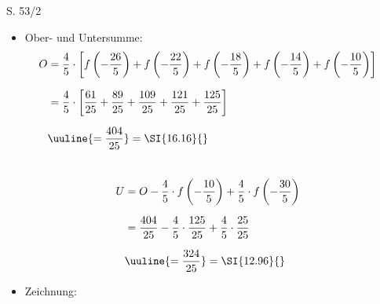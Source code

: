\begin{Exercise}{S. 53/2}{}
\begin{enumerate}[leftmargin=*]
\begin{enumerate}[label=\alph*),leftmargin=*]
{\begin{itemize}[leftmargin=*]
{                    }
                \item Ober- und Untersumme: \\[-2.0ex]{
                    \begin{align*}
                        O &= \dfrac{4}{5} \cdot \left[f\left(-\frac{26}{5}\right) + f\left(-\frac{22}{5}\right) + f\left(-\frac{18}{5}\right) + f\left(-\frac{14}{5}\right) + f\left(-\frac{10}{5}\right)\right] && \\[1.5ex]
                        &= \dfrac{4}{5} \cdot \left[\dfrac{61}{25} + \dfrac{89}{25} + \dfrac{109}{25} + \dfrac{121}{25} + \dfrac{125}{25} \right] && \\[1.5ex]
                        &\uuline{= \dfrac{404}{25}} = \SI{16.16}{} &&
                    \end{align*}\\[-2.0ex]
                    \begin{align*}
                        U &= O - \dfrac{4}{5} \cdot f\left(-\frac{10}{5}\right) + \dfrac{4}{5} \cdot f\left(-\frac{30}{5}\right) && \\[1.5ex]
                        &= \dfrac{404}{25} - \dfrac{4}{5} \cdot \dfrac{125}{25} + \dfrac{4}{5} \cdot \dfrac{25}{25} && \\[1.5ex]
                        &\uuline{= \dfrac{324}{25}} = \SI{12.96}{} &&
                    \end{align*}
                }
                \item Zeichnung: \\[-2.0ex]{
                    }
\end{itemize}}
\end{enumerate}
\end{enumerate}
\end{Exercise}
